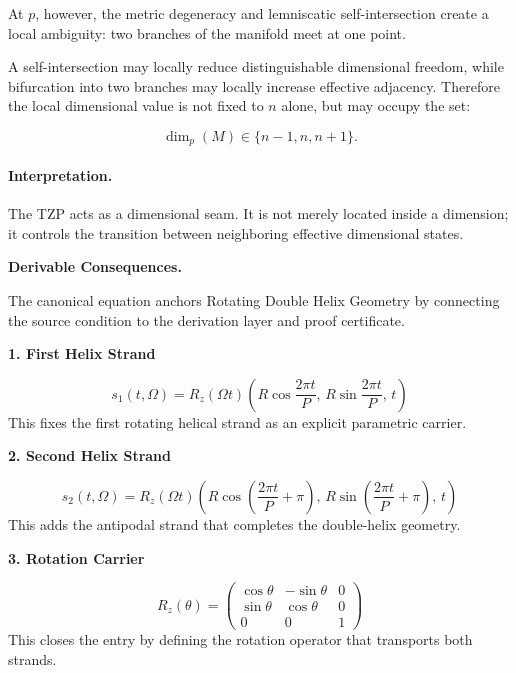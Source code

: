 At $p$, however, the metric degeneracy and lemniscatic self-intersection create a local ambiguity: two branches of the manifold meet at one point.

A self-intersection may locally reduce distinguishable dimensional freedom, while bifurcation into two branches may locally increase effective adjacency. Therefore the local dimensional value is not fixed to $n$ alone, but may occupy the set:

\begin{equation}
\dim_p(M)\in\{n-1,n,n+1\}.
\end{equation}

\paragraph{Interpretation.}
The TZP acts as a dimensional seam. It is not merely located inside a dimension; it controls the transition between neighboring effective dimensional states.

\par\vspace{0.35em}
\noindent\textbf{Derivable Consequences.}\quad
\begingroup
\footnotesize
\raggedright
The canonical equation anchors Rotating Double Helix Geometry by connecting the source condition to the derivation layer and proof certificate.
\par\endgroup

\noindent\textbf{1. First Helix Strand}\par
\[
s_1(t,\Omega)=R_z(\Omega t)\!\left(R\cos\!\frac{2\pi t}{P},\,R\sin\!\frac{2\pi t}{P},\,t\right)
\]
\noindent This fixes the first rotating helical strand as an explicit parametric carrier.\par
\noindent\textbf{2. Second Helix Strand}\par
\[
s_2(t,\Omega)=R_z(\Omega t)\!\left(R\cos\!\left(\frac{2\pi t}{P}+\pi\right),\,R\sin\!\left(\frac{2\pi t}{P}+\pi\right),\,t\right)
\]
\noindent This adds the antipodal strand that completes the double-helix geometry.\par
\noindent\textbf{3. Rotation Carrier}\par
\[
R_z(\theta)=\begin{pmatrix}\cos\theta & -\sin\theta & 0\\ \sin\theta & \cos\theta & 0\\ 0 & 0 & 1\end{pmatrix}
\]
\noindent This closes the entry by defining the rotation operator that transports both strands.\par

